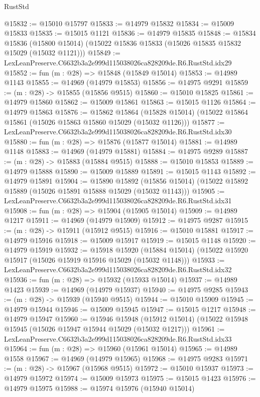 \begin{lexlean}{RustStd}
\begin{coremodule}
@15832 := @15010 @15797
@15833 := @14979 @15832
@15834 := @15009 @15833
@15835 := @15015 @1121
@15836 := @14979 @15835
@15848 := @15834
    @15836
    (@15800 @15014)
    (@15022 @15836 @15833 (@15026 @15835 @15832 @15029 (@15032 @1121)))
@15849 := LexLeanPreserve.C6632b3a2e999d115038026ca828209de.R6.RustStd.idx29
@15852 := fun (m : @28) => @15848 (@15849 @15014)
@15853 := @14989 @1143
@15855 := @14969 (@14979 @15853)
@15856 := @14975 @9291
@15859 := (m : @28) -> @15855 (@15856 @9515)
@15860 := @15010 @15825
@15861 := @14979 @15860
@15862 := @15009 @15861
@15863 := @15015 @1126
@15864 := @14979 @15863
@15876 := @15862
    @15864
    (@15828 @15014)
    (@15022 @15864 @15861 (@15026 @15863 @15860 @15029 (@15032 @1126)))
@15877 := LexLeanPreserve.C6632b3a2e999d115038026ca828209de.R6.RustStd.idx30
@15880 := fun (m : @28) => @15876 (@15877 @15014)
@15881 := @14989 @1148
@15883 := @14969 (@14979 @15881)
@15884 := @14975 @9289
@15887 := (m : @28) -> @15883 (@15884 @9515)
@15888 := @15010 @15853
@15889 := @14979 @15888
@15890 := @15009 @15889
@15891 := @15015 @1143
@15892 := @14979 @15891
@15904 := @15890
    @15892
    (@15856 @15014)
    (@15022 @15892 @15889 (@15026 @15891 @15888 @15029 (@15032 @1143)))
@15905 := LexLeanPreserve.C6632b3a2e999d115038026ca828209de.R6.RustStd.idx31
@15908 := fun (m : @28) => @15904 (@15905 @15014)
@15909 := @14989 @1217
@15911 := @14969 (@14979 @15909)
@15912 := @14975 @9287
@15915 := (m : @28) -> @15911 (@15912 @9515)
@15916 := @15010 @15881
@15917 := @14979 @15916
@15918 := @15009 @15917
@15919 := @15015 @1148
@15920 := @14979 @15919
@15932 := @15918
    @15920
    (@15884 @15014)
    (@15022 @15920 @15917 (@15026 @15919 @15916 @15029 (@15032 @1148)))
@15933 := LexLeanPreserve.C6632b3a2e999d115038026ca828209de.R6.RustStd.idx32
@15936 := fun (m : @28) => @15932 (@15933 @15014)
@15937 := @14989 @1423
@15939 := @14969 (@14979 @15937)
@15940 := @14975 @9285
@15943 := (m : @28) -> @15939 (@15940 @9515)
@15944 := @15010 @15909
@15945 := @14979 @15944
@15946 := @15009 @15945
@15947 := @15015 @1217
@15948 := @14979 @15947
@15960 := @15946
    @15948
    (@15912 @15014)
    (@15022 @15948 @15945 (@15026 @15947 @15944 @15029 (@15032 @1217)))
@15961 := LexLeanPreserve.C6632b3a2e999d115038026ca828209de.R6.RustStd.idx33
@15964 := fun (m : @28) => @15960 (@15961 @15014)
@15965 := @14989 @1558
@15967 := @14969 (@14979 @15965)
@15968 := @14975 @9283
@15971 := (m : @28) -> @15967 (@15968 @9515)
@15972 := @15010 @15937
@15973 := @14979 @15972
@15974 := @15009 @15973
@15975 := @15015 @1423
@15976 := @14979 @15975
@15988 := @15974
    @15976
    (@15940 @15014)

\end{coremodule}
\end{lexlean}
